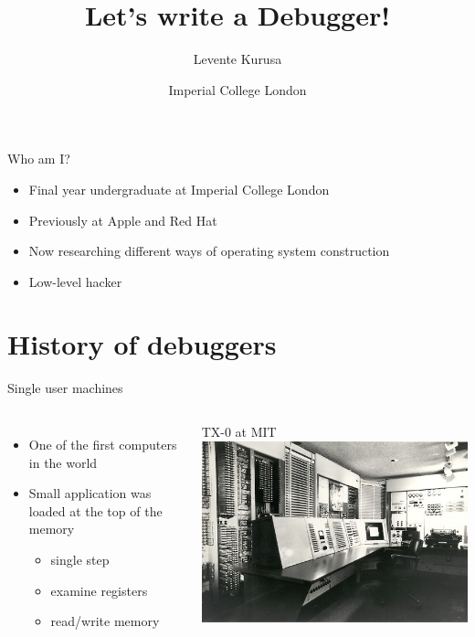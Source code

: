 \documentclass{beamer} %
\title{Let's write a Debugger!}
\author{Levente Kurusa \myemail}
\date{Imperial College London}
\institute{\texttt{linux.conf.au 2018}, Sydney, Australia \hfill January 25, 2018}
\begin{document}
\maketitle

\begin{frame}{Who am I?}
\begin{itemize}
  \item Final year undergraduate at Imperial College London
  \item Previously at Apple and Red Hat
  \item Now researching different ways of operating system construction
  \item Low-level hacker
\end{itemize}
\end{frame}

\section{History of debuggers}

\begin{frame}{Single user machines}

\begin{columns}
\begin{itemize}
    \item One of the first computers in the world
    \item Small application was loaded at the top of the memory
      \begin{itemize}
          \item single step
          \item examine registers
          \item read/write memory
      \end{itemize}
\end{itemize}

\begin{block}{TX-0 at MIT}
\includegraphics[width=0.4\paperwidth]{tx0.jpg}
\end{block}

\end{columns}


\end{frame}
\end{document}
